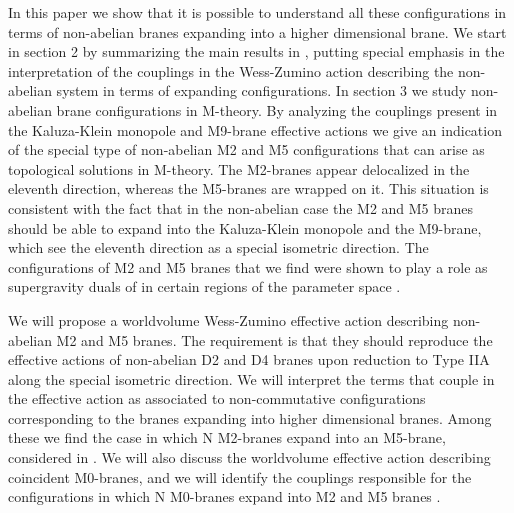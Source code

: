 \documentclass[12pt,a4paper]{article}
\begin{document}
In this paper we show that it is possible to understand all
these configurations in terms of non-abelian branes 
expanding into a higher dimensional brane. We start in section 2 by
summarizing the main results in \cite{Myers,CMT}, putting 
special emphasis in the interpretation of the couplings 
in the Wess-Zumino action describing the non-abelian system
in terms of expanding configurations.
In section 3 we study non-abelian
brane configurations in M-theory. By analyzing the couplings present
in the Kaluza-Klein monopole and M9-brane effective actions we give
an indication of the special type of
non-abelian M2 and M5 configurations that can arise as topological 
solutions in M-theory. The M2-branes appear delocalized in the 
eleventh direction, whereas the M5-branes are wrapped on it. 
This situation is consistent with the fact that in the non-abelian
case the M2 and M5 branes should be able to expand into the Kaluza-Klein
monopole and the M9-brane, which see the eleventh direction
as a special isometric direction. The configurations of M2 and M5
branes that we find were shown to
play a role as supergravity duals of \coordHE{} 
in certain regions
of the parameter space \cite{IMSY}.

We will propose a worldvolume Wess-Zumino effective action describing 
non-abelian M2 and M5 branes.
The requirement is that they should reproduce
the effective actions of non-abelian D2 and D4 branes upon
reduction to Type IIA along the special isometric direction. 
We will interpret the terms that couple in the effective action as
associated to non-commutative configurations corresponding to the
branes expanding into higher dimensional branes. Among these
we find the case in which N M2-branes expand into an
M5-brane, considered in \cite{Bena2}. We will also discuss the
worldvolume effective action describing coincident M0-branes, and
we will identify the couplings responsible for the configurations
in which N M0-branes expand
into M2 and M5 branes \cite{GST,GMT,DTV}. 
\end{document}
